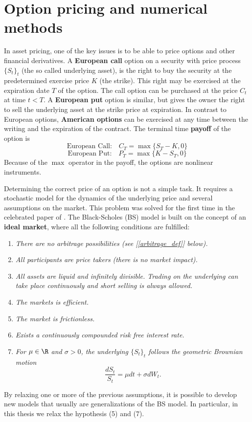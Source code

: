 

\chapter{Option pricing and numerical methods}\label{Chapter2}
\minitoc%

\vspace{5em}


In asset pricing, one of the key issues is to be able to price options and other financial derivatives. 
A \textbf{European call} option on a security with price process $\{S_t\}_ t$ (the so called underlying asset), is the right to 
buy the security at the predetermined exercise price $K$ (the strike). This right may be exercised at the expiration date $T$ of the option.
The call option can be purchased at the price $C_t$ at time $t<T$.
A \textbf{European put} option is similar, but gives the owner the right to sell the underlying asset at the strike price at expiration. 
In contrast to European options, \textbf{American options} can be exercised at any time between the writing and the expiration of the contract.
The terminal time \textbf{payoff} of the option is
$$ \mbox{European Call:} \quad C_T = \max \{ S_T - K, 0 \} $$
$$ \mbox{European Put:} \quad P_T = \max \{ K - S_T, 0 \} $$
Because of the $\max$ operator in the payoff, the options are nonlinear instruments. 

Determining the correct price of an option is not a simple task. 
It requires a stochastic model for the dynamics of the underlying price and several assumptions on the market.
This problem was solved for the first time in the celebrated paper of \cite{BS73}. 
The Black-Scholes (BS) model is built on the concept of an \textbf{ideal market}, where all the following 
conditions are fulfilled:
\begin{enumerate}
 \item \emph{There are no arbitrage possibilities (see [\ref{arbitrage_def}] below).}
 \item \emph{All participants are price takers (there is no market impact).}
 \item \emph{All assets are liquid and infinitely divisible. Trading on the underlying can take place continuously and short selling is always allowed.}
 \item \emph{The markets is efficient.}
 \item \emph{The market is frictionless.}
 \item \emph{Exists a continuously compounded risk free interest rate.}
 \item \emph{For $\mu \in \R$ and $\sigma > 0$, the underlying $\{S_t\}_t$ follows the geometric Brownian motion}
	\begin{equation}\label{GBM2}
	  \frac{dS_t}{S_t} = \mu dt + \sigma dW_t.
	\end{equation}
\end{enumerate}
By relaxing one or more of the previous assumptions, it is possible to develop new models that usually are generalizations of the BS model.
In particular, in this thesis we relax the hypothesis (5) and (7). 

